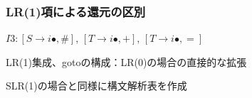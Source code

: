 \documentclass[ckj]{beamer}
\begin{document}

 \begin{frame}
  \frametitle{LR(1)項による還元の区別}
  
  $I3:$\quad $[S\rightarrow i\bullet,\#]$,
  $[T\rightarrow i\bullet,\mathtt{+}]$,
  $[T\rightarrow i\bullet,\mathtt{=}]$

  \begin{list}{}{}
   \item {}
   \item {}
  \end{list}

  LR(1)集成、gotoの構成：LR(0)の場合の直接的な拡張

  SLR(1)の場合と同様に構文解析表を作成
 \end{frame}
\end{document}
